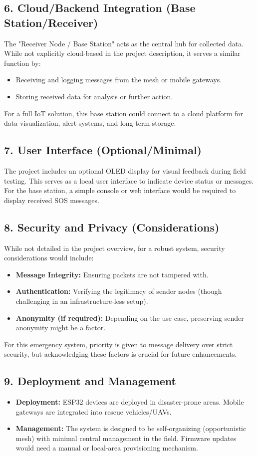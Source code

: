 \documentclass[12pt, a4paper]{article}
\begin{document}
\subsection{6. Cloud/Backend Integration (Base Station/Receiver)}
The "Receiver Node / Base Station" acts as the central hub for collected data. While not explicitly cloud-based in the project description, it serves a similar function by:
\begin{itemize}
    \item Receiving and logging messages from the mesh or mobile gateways.
    \item Storing received data for analysis or further action.
\end{itemize}
For a full IoT solution, this base station could connect to a cloud platform for data visualization, alert systems, and long-term storage.

\subsection{7. User Interface (Optional/Minimal)}
The project includes an optional OLED display for visual feedback during field testing. This serves as a local user interface to indicate device status or messages. For the base station, a simple console or web interface would be required to display received SOS messages.

\subsection{8. Security and Privacy (Considerations)}
While not detailed in the project overview, for a robust system, security considerations would include:
\begin{itemize}
    \item \textbf{Message Integrity:} Ensuring packets are not tampered with.
    \item \textbf{Authentication:} Verifying the legitimacy of sender nodes (though challenging in an infrastructure-less setup).
    \item \textbf{Anonymity (if required):} Depending on the use case, preserving sender anonymity might be a factor.
\end{itemize}
For this emergency system, priority is given to message delivery over strict security, but acknowledging these factors is crucial for future enhancements.

\subsection{9. Deployment and Management}
\begin{itemize}
    \item \textbf{Deployment:} ESP32 devices are deployed in disaster-prone areas. Mobile gateways are integrated into rescue vehicles/UAVs.
    \item \textbf{Management:} The system is designed to be self-organizing (opportunistic mesh) with minimal central management in the field. Firmware updates would need a manual or local-area provisioning mechanism.
\end{itemize}
\end{document}
